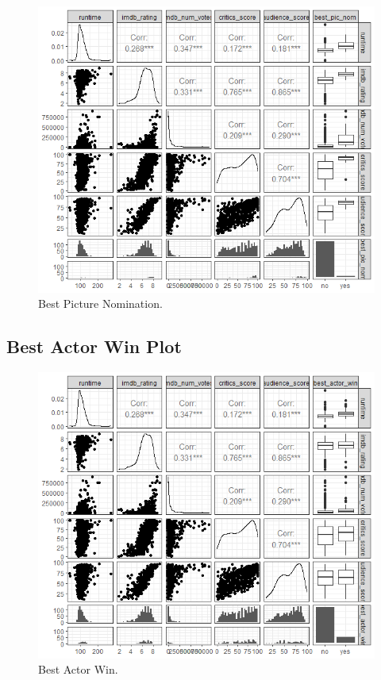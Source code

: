\documentclass[12pt,letterpaper]{article}
\begin{document}
  


\begin{figure}[h!]\centering
	\caption{\footnotesize Best Picture Nomination.}
	\label{fig:plot_1}
	\includegraphics[width=.75\textwidth]{best pic nom 2.png}
\end{figure}

	\vspace{1cm}
	\newpage
	
\subsection*{Best Actor Win Plot}


\begin{figure}[h!]\centering
	\caption{\footnotesize Best Actor Win.}
	\label{fig:plot_2}
	\includegraphics[width=.75\textwidth]{best actor 2.png}
\end{figure}
\end{document}
